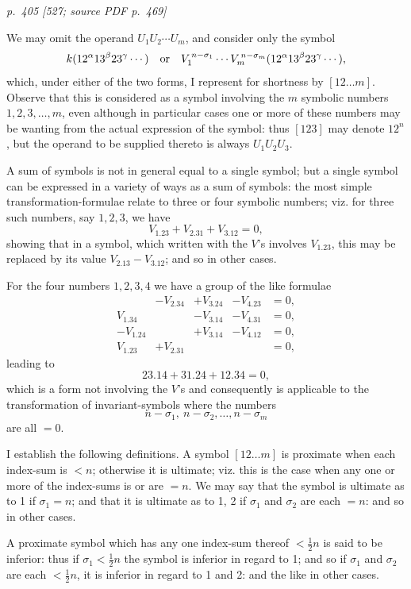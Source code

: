 \documentclass[11pt,a4paper]{article}
\newcommand{\pagemarker}[3]{\par\bigskip\noindent\textit{p.~#1 [#2; source PDF p.~#3]}\par\smallskip}
\begin{document}
\pagemarker{405}{527}{469}

We may omit the operand $U_1U_2\cdots U_m$, and consider only the symbol
\[
k(12^\alpha 13^\beta23^\gamma\cdots)
\quad\hbox{or}\quad
V_1^{\,n-\sigma_1}\cdots V_m^{\,n-\sigma_m}
(12^\alpha13^\beta23^\gamma\cdots),
\]
which, under either of the two forms, I represent for shortness by $[12\ldots m]$.
Observe that this is considered as a symbol involving the $m$ symbolic numbers
$1,2,3,\ldots,m$, even although in particular cases one or more of these numbers may
be wanting from the actual expression of the symbol: thus $[123]$ may denote $12^n$,
but the operand to be supplied thereto is always $U_1U_2U_3$.

A sum of symbols is not in general equal to a single symbol; but a single symbol can
be expressed in a variety of ways as a sum of symbols: the most simple
transformation-formulae relate to three or four symbolic numbers; viz. for three such
numbers, say $1,2,3$, we have
\[
V_1.23+V_2.31+V_3.12=0,
\]
showing that in a symbol, which written with the $V$'s involves $V_1.23$, this may
be replaced by its value $V_2.13-V_3.12$; and so in other cases.

For the four numbers $1,2,3,4$ we have a group of the like formulae
\[
\begin{array}{rrrrr}
&-V_2.34&+V_3.24&-V_4.23&=0,\\
V_1.34&&-V_3.14&-V_4.31&=0,\\
-V_1.24&&+V_3.14&-V_4.12&=0,\\
V_1.23&+V_2.31&&&=0,
\end{array}
\]
leading to
\[
23.14+31.24+12.34=0,
\]
which is a form not involving the $V$'s and consequently is applicable to the
transformation of invariant-symbols where the numbers
\[
n-\sigma_1,\ n-\sigma_2,\ldots,n-\sigma_m
\]
are all $=0$.

I establish the following definitions. A symbol $[12\ldots m]$ is proximate when each
index-sum is $<n$; otherwise it is ultimate; viz. this is the case when any one or
more of the index-sums is or are $=n$. We may say that the symbol is ultimate as to
1 if $\sigma_1=n$; and that it is ultimate as to 1, 2 if $\sigma_1$ and $\sigma_2$ are each
$=n$: and so in other cases.

A proximate symbol which has any one index-sum thereof $<\frac12n$ is said to be
inferior: thus if $\sigma_1<\frac12n$ the symbol is inferior in regard to 1; and so if
$\sigma_1$ and $\sigma_2$ are each $<\frac12n$, it is inferior in regard to 1 and 2: and the
like in other cases.
\end{document}
